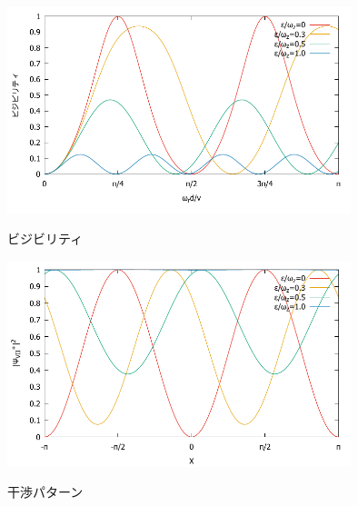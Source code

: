 \begin{figure}[h]
\begin{center}
\includegraphics[width=10cm]{nonreso/resonance_visivility1.pdf}
\caption{ビジビリティ}
\label{Nonreso_fig_visivility}
\includegraphics[width=10cm]{nonreso/resonance_interference1.pdf}
\caption{干渉パターン}
\label{Nonreso_fig_interference}
\end{center}
\end{figure}

\renewcommand{\arraystretch}{1}


